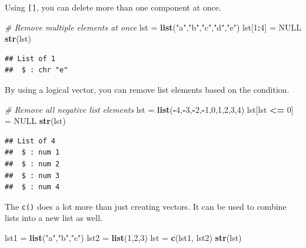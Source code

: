 \documentclass[
]{book}
\newenvironment{Shaded}{\begin{snugshade}}{\end{snugshade}}
\newcommand{\CommentTok}[1]{\textcolor[rgb]{0.56,0.35,0.01}{\textit{#1}}}
\newcommand{\DecValTok}[1]{\textcolor[rgb]{0.00,0.00,0.81}{#1}}
\newcommand{\KeywordTok}[1]{\textcolor[rgb]{0.13,0.29,0.53}{\textbf{#1}}}
\newcommand{\NormalTok}[1]{#1}
\newcommand{\OperatorTok}[1]{\textcolor[rgb]{0.81,0.36,0.00}{\textbf{#1}}}
\newcommand{\OtherTok}[1]{\textcolor[rgb]{0.56,0.35,0.01}{#1}}
\newcommand{\StringTok}[1]{\textcolor[rgb]{0.31,0.60,0.02}{#1}}
\begin{document}
Using \texttt{{[}{]}}, you can delete more than one component at once.

\begin{Shaded}
\begin{Highlighting}[]
\CommentTok{# Remove multiple elements at once}
\NormalTok{lst =}\StringTok{ }\KeywordTok{list}\NormalTok{(}\StringTok{"a"}\NormalTok{,}\StringTok{"b"}\NormalTok{,}\StringTok{"c"}\NormalTok{,}\StringTok{"d"}\NormalTok{,}\StringTok{"e"}\NormalTok{)}
\NormalTok{lst[}\DecValTok{1}\OperatorTok{:}\DecValTok{4}\NormalTok{] =}\StringTok{ }\OtherTok{NULL}
\KeywordTok{str}\NormalTok{(lst)}
\end{Highlighting}
\end{Shaded}

\begin{verbatim}
## List of 1
##  $ : chr "e"
\end{verbatim}

By using a logical vector, you can remove list elements based on the condition.

\begin{Shaded}
\begin{Highlighting}[]
\CommentTok{# Remove all negative list elements}
\NormalTok{lst =}\StringTok{ }\KeywordTok{list}\NormalTok{(}\OperatorTok{-}\DecValTok{4}\NormalTok{,}\OperatorTok{-}\DecValTok{3}\NormalTok{,}\OperatorTok{-}\DecValTok{2}\NormalTok{,}\OperatorTok{-}\DecValTok{1}\NormalTok{,}\DecValTok{0}\NormalTok{,}\DecValTok{1}\NormalTok{,}\DecValTok{2}\NormalTok{,}\DecValTok{3}\NormalTok{,}\DecValTok{4}\NormalTok{)}
\NormalTok{lst[lst }\OperatorTok{<=}\StringTok{ }\DecValTok{0}\NormalTok{] =}\StringTok{ }\OtherTok{NULL}
\KeywordTok{str}\NormalTok{(lst)}
\end{Highlighting}
\end{Shaded}

\begin{verbatim}
## List of 4
##  $ : num 1
##  $ : num 2
##  $ : num 3
##  $ : num 4
\end{verbatim}

The \texttt{c()} does a lot more than just creating vectors. It can be used to combine lists into a new list as well.

\begin{Shaded}
\begin{Highlighting}[]
\NormalTok{lst1 =}\StringTok{ }\KeywordTok{list}\NormalTok{(}\StringTok{"a"}\NormalTok{,}\StringTok{"b"}\NormalTok{,}\StringTok{"c"}\NormalTok{)}
\NormalTok{lst2 =}\StringTok{ }\KeywordTok{list}\NormalTok{(}\DecValTok{1}\NormalTok{,}\DecValTok{2}\NormalTok{,}\DecValTok{3}\NormalTok{)}
\NormalTok{lst =}\StringTok{ }\KeywordTok{c}\NormalTok{(lst1, lst2)}
\KeywordTok{str}\NormalTok{(lst)}
\end{Highlighting}
\end{Shaded}
\end{document}
